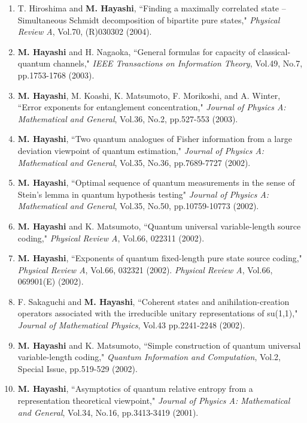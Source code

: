 \documentclass[a4paper,12pt,oneside]{article}
\begin{document}
\begin{enumerate}
\item
T. Hiroshima and \textbf{M. Hayashi}, ``Finding a maximally correlated state -- Simultaneous Schmidt decomposition of bipartite pure states," 
{\em Physical Review A}, Vol.70, (R)030302 (2004).

\item
\textbf{M. Hayashi} and H. Nagaoka, ``General formulas for capacity of classical-quantum channels," 
{\em IEEE Transactions on Information Theory}, Vol.49, No.7, pp.1753-1768 (2003).

\item
\textbf{M. Hayashi}, M. Koashi, K. Matsumoto, F. Morikoshi, and A. Winter, 
``Error exponents for entanglement concentration," 
{\em Journal of Physics A: Mathematical and General}, Vol.36, No.2, pp.527-553 (2003). 

\item
\textbf{M. Hayashi}, ``Two quantum analogues of Fisher information from a large deviation viewpoint of quantum estimation," 
{\em Journal of Physics A: Mathematical and General}, Vol.35, No.36, pp.7689-7727 (2002).

\item
\textbf{M. Hayashi}, ``Optimal sequence of quantum measurements in the sense of Stein's lemma in quantum hypothesis testing" 
{\em Journal of Physics A: Mathematical and General}, Vol.35, No.50, pp.10759-10773 (2002).

\item
\textbf{M. Hayashi} and K. Matsumoto, ``Quantum universal variable-length source coding," 
{\em Physical Review A}, Vol.66, 022311 (2002). 

\item
\textbf{M. Hayashi}, ``Exponents of quantum fixed-length pure state source coding," 
{\em Physical Review A}, Vol.66, 032321 (2002). 
{\em Physical Review A}, Vol.66, 069901(E) (2002).

\item
F. Sakaguchi and \textbf{M. Hayashi}, ``Coherent states and anihilation-creation operators associated with the irreducible unitary representations of su(1,1)," 
{\em Journal of Mathematical Physics}, Vol.43 pp.2241-2248 (2002).

\item
\textbf{M. Hayashi} and K. Matsumoto, ``Simple construction of quantum universal variable-length coding," 
{\em Quantum Information and Computation}, Vol.2, Special Issue, pp.519-529 (2002).

\item
\textbf{M. Hayashi}, ``Asymptotics of quantum relative entropy from a representation theoretical viewpoint," 
{\em Journal of Physics A: Mathematical and General}, Vol.34, No.16, pp.3413-3419 (2001).


\end{enumerate}
\end{document}
